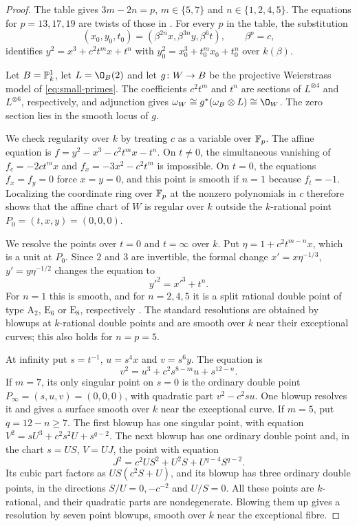 \begin{proof}
The table gives $3m-2n = p$, $m\in\{5,7\}$ and $n\in\{1,2,4,5\}$.
The equations for $p = 13,17,19$ are twists of those in \cite[Example~9.6 and Table~9]{Mat23}.
For every $p$ in the table, the substitution
\[
  (x_0,y_0,t_0) = (\beta^{2n}x,\beta^{3n}y,\beta^6t),
  \qquad \beta^p = c,
\]
identifies $y^2 = x^3+c^2t^mx+t^n$ with $y_0^2 = x_0^3+t_0^mx_0+t_0^n$ over $k(\beta)$.

Let $B = \mathbb{P}^1_k$, let $L = \O_B(2)$ and let $g\colon W\to B$ be the projective Weierstrass model of \eqref{eq:small-primes}.
The coefficients $c^2t^m$ and $t^n$ are sections of $L^{\otimes 4}$ and $L^{\otimes 6}$, respectively, and adjunction gives $\omega_W\cong g^*(\omega_B\otimes L)\cong\O_W$.
The zero section lies in the smooth locus of $g$.

We check regularity over $k$ by treating $c$ as a variable over $\mathbb{F}_p$.
The affine equation is $f = y^2-x^3-c^2t^mx-t^n$.
On $t\neq 0$, the simultaneous vanishing of $f_c = -2ct^mx$ and $f_x = -3x^2-c^2t^m$ is impossible.
On $t = 0$, the equations $f_x = f_y = 0$ force $x = y = 0$, and this point is smooth if $n = 1$ because $f_t = -1$.
Localizing the coordinate ring over $\mathbb{F}_p$ at the nonzero polynomials in $c$ therefore shows that the affine chart of $W$ is regular over $k$ outside the $k$-rational point $P_0 = (t,x,y) = (0,0,0)$.

We resolve the points over $t = 0$ and $t = \infty$ over $k$.
Put $\eta = 1+c^2t^{m-n}x$, which is a unit at $P_0$.
Since $2$ and $3$ are invertible, the formal change $x' = x\eta^{-1/3}$, $y' = y\eta^{-1/2}$ changes the equation to
\[
  y'^2 = x'^3+t^n.
\]
For $n = 1$ this is smooth, and for $n = 2,4,5$ it is a split rational double point of type $\mathrm A_2$, $\mathrm E_6$ or $\mathrm E_8$, respectively \cite{Art77}.
The standard resolutions are obtained by blowups at $k$-rational double points and are smooth over $k$ near their exceptional curves; this also holds for $n = p = 5$.

At infinity put $s = t^{-1}$, $u = s^4x$ and $v = s^6y$.
The equation is
\[
  v^2 = u^3+c^2s^{8-m}u+s^{12-n}.
\]
If $m = 7$, its only singular point on $s = 0$ is the ordinary double point $P_\infty = (s,u,v) = (0,0,0)$, with quadratic part $v^2-c^2su$.
One blowup resolves it and gives a surface smooth over $k$ near the exceptional curve.
If $m = 5$, put $q = 12-n\geq 7$.
The first blowup has one singular point, with equation $V^2 = sU^3+c^2s^2U+s^{q-2}$.
The next blowup has one ordinary double point and, in the chart $s = US$, $V = UJ$, the point with equation
\[
  J^2 = c^2US^2+U^2S+U^{q-4}S^{q-2}.
\]
Its cubic part factors as $US(c^2S+U)$, and its blowup has three ordinary double points, in the directions $S/U = 0,-c^{-2}$ and $U/S = 0$.
All these points are $k$-rational, and their quadratic parts are nondegenerate.
Blowing them up gives a resolution by seven point blowups, smooth over $k$ near the exceptional fibre.


\end{proof}
